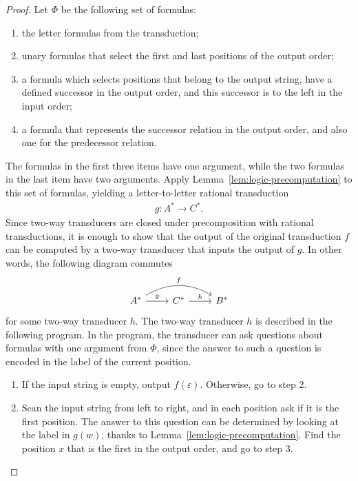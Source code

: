 \begin{proof}
    Let $\Phi$ be the following set of formulas: 
    \begin{enumerate}
        \item the letter formulas from the transduction;
         \item unary formulas that select the first and last positions of the output order;
        \item a formula which selects positions that  belong to the output string, have a defined successor in the output order, and this  successor is to the left in the input order;
          \item a formula that represents the successor relation in the output order, and also one for the predecessor relation.
    \end{enumerate}
    The formulas in the first three items have one argument, while the two formulas in the last item have two arguments. Apply Lemma~\ref{lem:logic-precomputation} to this set of formulas, yielding a letter-to-letter rational transduction  
    \begin{align*}
     g : A^* \to C^*.
    \end{align*}
    Since two-way transducers are closed under precomposition with rational transductions, it is enough to show that the output of the original \mso transduction $f$ can be computed by a two-way transducer that inputs the output of $g$. In other words, the following diagram commutes
    \[
    \begin{tikzcd}
    A^* 
    \ar[r,"g"] 
    \ar[rr,"f",bend left]
    & 
    C^*
    \ar[r,"h"]
    & 
    B^*
    \end{tikzcd}
    \]
    for some two-way transducer $h$. The two-way transducer $h$ is described in the following program. In the program, the transducer can ask questions about formulas with one argument from $\Phi$, since the answer to such a question is encoded in the label of the current position. 
    \begin{enumerate}
        \item If the input string is empty, output $f(\varepsilon)$. Otherwise, go to step 2.
        \item Scan the input string from left to right, and in each position ask if it is the first position. The answer to this question can be determined by looking at the label in $g(w)$, thanks to Lemma~\ref{lem:logic-precomputation}. Find the position $x$ that is the first in the output order, and go to step 3.

\end{enumerate}
\end{proof}
